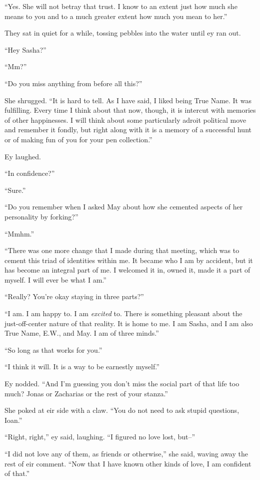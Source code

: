 ``Yes. She will not betray that trust. I know to an extent just how much she means to you and to a much greater extent how much you mean to her.''

They sat in quiet for a while, tossing pebbles into the water until ey ran out.

``Hey Sasha?''

``Mm?''

``Do you miss anything from before all this?''

She shrugged. ``It is hard to tell. As I have said, I liked being True Name. It was fulfilling. Every time I think about that now, though, it is intercut with memories of other happinesses. I will think about some particularly adroit political move and remember it fondly, but right along with it is a memory of a successful hunt or of making fun of you for your pen collection.''

Ey laughed.

``In confidence?''

``Sure.''

``Do you remember when I asked May about how she cemented aspects of her personality by forking?''

``Mmhm.''

``There was one more change that I made during that meeting, which was to cement this triad of identities within me. It became who I am by accident, but it has become an integral part of me. I welcomed it in, owned it, made it a part of myself. I will ever be what I am.''

``Really? You're okay staying in three parts?''

``I am. I am happy to. I am \emph{excited} to. There is something pleasant about the just-off-center nature of that reality. It is home to me. I am Sasha, and I am also True Name, E.W., and May. I am of three minds.''

``So long as that works for you.''

``I think it will. It is a way to be earnestly myself.''

Ey nodded. ``And I'm guessing you don't miss the social part of that life too much? Jonas or Zacharias or the rest of your stanza.''

She poked at eir side with a claw. ``You do not need to ask stupid questions, Ioan.''

``Right, right,'' ey said, laughing. ``I figured no love lost, but--''

``I did not love any of them, as friends or otherwise,'' she said, waving away the rest of eir comment. ``Now that I have known other kinds of love, I am confident of that.''

